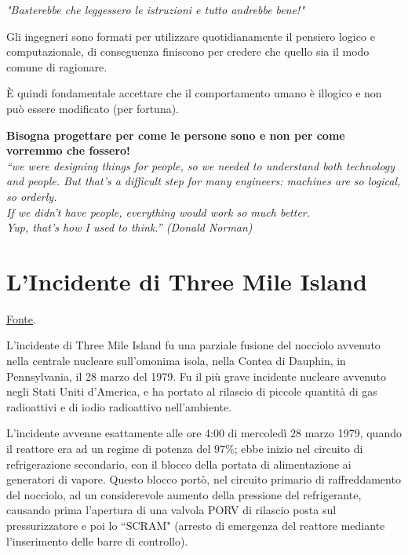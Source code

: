 \begin{flushleft}
\textit{"Basterebbe che leggessero le istruzioni e tutto andrebbe bene!"}
\end{flushleft}


Gli ingegneri sono formati per utilizzare quotidianamente il pensiero logico e computazionale, di conseguenza finiscono per credere
che quello sia il modo comune di ragionare. 


È quindi fondamentale accettare che il comportamento umano è illogico e non può essere modificato (per fortuna). 
\begin{flushleft}
\textbf{Bisogna progettare per come le persone sono e non per come vorremmo che fossero!}
\\
\textit{``we were designing things for people, so we needed to understand both technology and people. But that’s a difficult step
for many engineers: machines are so logical, so orderly. \\
If we didn’t have people, everything would work so much better. \\
Yup, that’s how I used to think.” (Donald Norman)}
\end{flushleft}

\section{L'Incidente di Three Mile Island}
\href{https://it.wikipedia.org/wiki/Incidente_di_Three_Mile_Island}{\underline{Fonte}}.
\vspace{\baselineskip}

L'incidente di Three Mile Island fu una parziale fusione del nocciolo avvenuto nella centrale nucleare sull'omonima isola, nella
Contea di Dauphin, in Pennsylvania, il 28 marzo del 1979. Fu il più grave incidente nucleare avvenuto negli Stati Uniti d'America,
e ha portato al rilascio di piccole quantità di gas radioattivi e di iodio radioattivo nell'ambiente.


L'incidente avvenne esattamente alle ore 4:00 di mercoledì 28 marzo 1979, quando il reattore era ad un regime di potenza del $97\%$;
ebbe inizio nel circuito di refrigerazione secondario, con il blocco della portata di alimentazione ai generatori di vapore.
Questo blocco portò, nel circuito primario di raffreddamento del nocciolo, ad un considerevole aumento della pressione del refrigerante,
causando prima l'apertura di una valvola PORV di rilascio posta sul pressurizzatore e poi lo ``SCRAM" (arresto di emergenza del reattore
mediante l'inserimento delle barre di controllo). 

